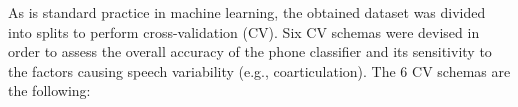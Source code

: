 As is standard practice in machine learning, the obtained dataset was divided into
splits to perform cross-validation (CV). 
Six CV schemas were devised in order to assess the overall accuracy of the phone classifier and its
sensitivity to the factors causing speech variability (e.g., coarticulation). The $6$ CV schemas
are the following:


